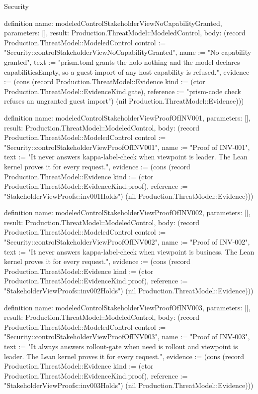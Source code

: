 \begin{lexlean}{Security}
\begin{semanticmodule}
definition{
  name: modeledControlStakeholderViewNoCapabilityGranted,
  parameters: [],
  result: Production.ThreatModel::ModeledControl,
  body: (record Production.ThreatModel::ModeledControl {control := "Security::controlStakeholderViewNoCapabilityGranted", name := "No capability granted", text := "prism.toml grants the holo nothing and the model declares capabilitiesEmpty, so a guest import of any host capability is refused.", evidence := (cons (record Production.ThreatModel::Evidence {kind := (ctor Production.ThreatModel::EvidenceKind.gate), reference := "prism-code check refuses an ungranted guest import"}) (nil Production.ThreatModel::Evidence))})
}

definition{
  name: modeledControlStakeholderViewProofOfINV001,
  parameters: [],
  result: Production.ThreatModel::ModeledControl,
  body: (record Production.ThreatModel::ModeledControl {control := "Security::controlStakeholderViewProofOfINV001", name := "Proof of INV-001", text := "It never answers kappa-label-check when viewpoint is leader. The Lean kernel proves it for every request.", evidence := (cons (record Production.ThreatModel::Evidence {kind := (ctor Production.ThreatModel::EvidenceKind.proof), reference := "StakeholderViewProofs::inv001Holds"}) (nil Production.ThreatModel::Evidence))})
}

definition{
  name: modeledControlStakeholderViewProofOfINV002,
  parameters: [],
  result: Production.ThreatModel::ModeledControl,
  body: (record Production.ThreatModel::ModeledControl {control := "Security::controlStakeholderViewProofOfINV002", name := "Proof of INV-002", text := "It never answers kappa-label-check when viewpoint is business. The Lean kernel proves it for every request.", evidence := (cons (record Production.ThreatModel::Evidence {kind := (ctor Production.ThreatModel::EvidenceKind.proof), reference := "StakeholderViewProofs::inv002Holds"}) (nil Production.ThreatModel::Evidence))})
}

definition{
  name: modeledControlStakeholderViewProofOfINV003,
  parameters: [],
  result: Production.ThreatModel::ModeledControl,
  body: (record Production.ThreatModel::ModeledControl {control := "Security::controlStakeholderViewProofOfINV003", name := "Proof of INV-003", text := "It always answers rollout-gate when need is rollout and viewpoint is leader. The Lean kernel proves it for every request.", evidence := (cons (record Production.ThreatModel::Evidence {kind := (ctor Production.ThreatModel::EvidenceKind.proof), reference := "StakeholderViewProofs::inv003Holds"}) (nil Production.ThreatModel::Evidence))})
}


\end{semanticmodule}
\end{lexlean}
